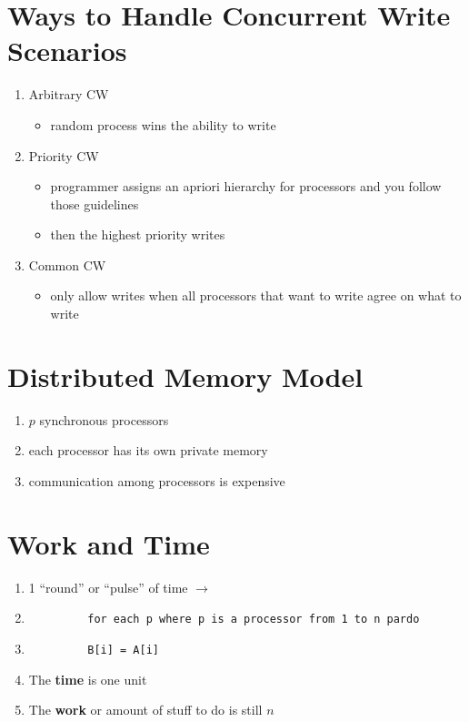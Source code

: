 \documentclass[twoside]{article}
\begin{document}
\section{Ways to Handle Concurrent Write Scenarios}
\begin{enumerate}
   \item Arbitrary CW 
   \begin{itemize}
      \item random process wins the ability to write
   \end{itemize}
   \item Priority CW
   \begin{itemize}
      \item programmer assigns an apriori hierarchy for processors and you follow those guidelines
      \item then the highest priority writes
   \end{itemize}
   \item Common CW
   \begin{itemize}
      \item only allow writes when all processors that want to write agree on what to write
   \end{itemize}
\end{enumerate}
\section{Distributed Memory Model}
\begin{enumerate}
      \item $p$ synchronous processors
      \item each processor has its own private memory
      \item communication among processors is expensive
\end{enumerate}
\section{Work and Time}
\begin{enumerate}
   \item 1 ``round'' or ``pulse'' of time $\rightarrow$
   \item \begin{verbatim}
         for each p where p is a processor from 1 to n pardo
         \end{verbatim}
   \item \begin{verbatim}
         B[i] = A[i]
         \end{verbatim}
   \item The \textbf{time} is one unit
   \item The \textbf{work} or amount of stuff to do is still $n$
\end{enumerate}
\end{document}

